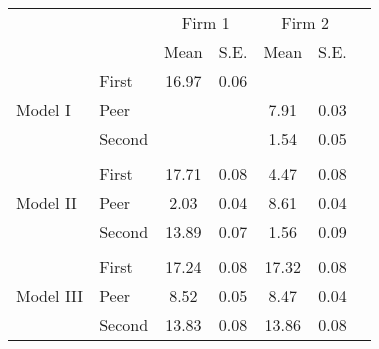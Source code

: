 \begin{tabular}{llccccc}
\toprule
 &  & \multicolumn{2}{c}{Firm 1} & \multicolumn{2}{c}{Firm 2} \\
                                    \cline{3-4} \cline{5-6}
 &  & Mean & S.E. & Mean & S.E. \\
\midrule
\multirow[c]{3}{*}{Model I} & First & 16.97 & 0.06 &  &  \\
 & Peer &  &  & 7.91 & 0.03 \\
 & Second &  &  & 1.54 & 0.05 \\
 &  &  &  &  &  \\
\multirow[c]{3}{*}{Model II} & First & 17.71 & 0.08 & 4.47 & 0.08 \\
 & Peer & 2.03 & 0.04 & 8.61 & 0.04 \\
 & Second & 13.89 & 0.07 & 1.56 & 0.09 \\
 &  &  &  &  &  \\
\multirow[c]{3}{*}{Model III} & First & 17.24 & 0.08 & 17.32 & 0.08 \\
 & Peer & 8.52 & 0.05 & 8.47 & 0.04 \\
 & Second & 13.83 & 0.08 & 13.86 & 0.08 \\
\bottomrule
\end{tabular}
